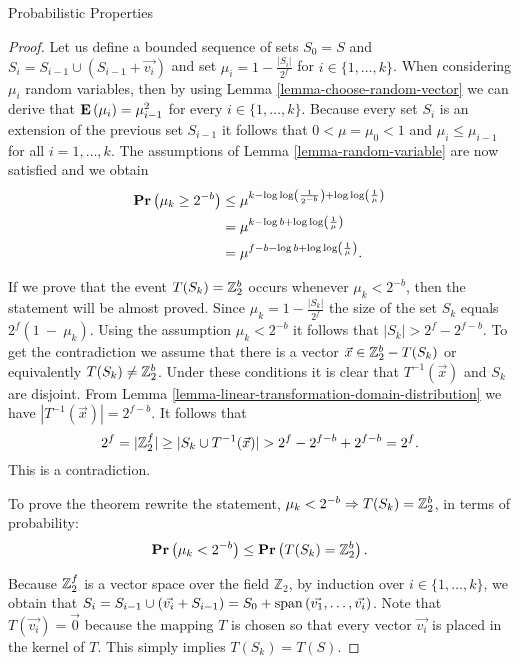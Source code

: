 \begin{section}{Probabilistic Properties}
\begin{proof}
Let us define a bounded sequence of sets $S_0 = S$ and $S_i = S_{i - 1} \cup (S_{i - 1} + \vec{v_i})$ and set $\mu_i = 1 - \frac{|S_i|}{2 ^ f}$ for $i \in \{ 1, \dots, k \}$. When considering $\mu_i$ random variables, then by using Lemma \ref{lemma-choose-random-vector}  we can derive that $\mathbf{E}\left(\mu_i\right) = \mu_{i - 1} ^ 2$ for every $i \in \{1, \dots, k \}$. Because every set $S_i$ is an extension of the previous set $S_{i - 1}$ it follows that $0 < \mu = \mu_0 < 1$ and $\mu_i \leq \mu_{i - 1}$ for all $i = 1, \dots, k$. The assumptions of Lemma \ref{lemma-random-variable} are now satisfied and we obtain
\[
\begin{split}
\mathbf{Pr}\left(\mu_k \geq 2 ^ {-b}\right) 
	& \leq \mu ^ {k - \log \log \left(\frac{1}{2 ^ {-b}}\right) + \log \log \left( \frac{1}{\mu} \right)} \\
	& = \mu ^ {k - \log b + \log \log \left(\frac{1}{\mu}\right)} \\
	& = \mu ^ {f - b - \log b + \log \log \left(\frac{1}{\mu}\right)} \text{.}
\end{split}
\]

If we prove that the event $T(S_k) = \mathbb{Z}_{2}^{b}$ occurs whenever $\mu_k < 2^{-b}$, then the statement will be almost proved. Since $\mu_k = 1 - \frac{|S_k|}{2 ^ f}$ the size of the set $S_k$ equals ${2 ^ f}(1~-~\mu_k)$. Using the assumption $\mu_k < 2 ^ {-b}$ it follows that $|S_k| > 2 ^ f - 2 ^ {f - b}$. To get the contradiction we assume that there is a vector $\vec{x} \in \mathbb{Z}_{2}^{b} - T(S_k)$ or equivalently $T(S_k) \neq \mathbb{Z}_{2}^{b}$. Under these conditions it is clear that $T ^ {-1}(\vec{x})$ and $S_k$ are disjoint. From Lemma \ref{lemma-linear-transformation-domain-distribution} we have $|T ^ {-1}(\vec{x})| = 2 ^ {f - b}$. It follows that
\[
2 ^ f = |\mathbb{Z}_{2}^{f}| \geq |S_k \cup T^{-1}(\vec{x})| > 2 ^ f - 2 ^ {f - b} + 2 ^ {f - b} = 2 ^ f \text{.}
\]
This is a contradiction. 

To prove the theorem rewrite the statement, $\mu_k < 2 ^ {-b} \Rightarrow T(S_k) = \mathbb{Z}_{2}^{b}$, in terms of probability:
\[
	\mathbf{Pr}\left(\mu_k < 2^{-b}\right) \leq \mathbf{Pr}\left(T(S_k) = \mathbb{Z}_{2}^{b}\right) \text{.}
\]

Because $\mathbb{Z}_{2}^{f}$ is a vector space over the field $\mathbb{Z}_2$, by induction over $i \in \{ 1, \dots, k \}$, we obtain that $S_i = S_{i - 1} \cup (\vec{v_i} + S_{i - 1}) = S_0 + \mathrm{span}\left({\vec{v_1}, \dots, \vec{v_i}}\right)$. Note that $T(\vec{v_i}) = \vec{0}$ because the mapping $T$ is chosen so that every vector $\vec{v_i}$ is placed in the kernel of $T$. This simply implies $T(S_k) = T(S)$.


\end{proof}
\end{section}
